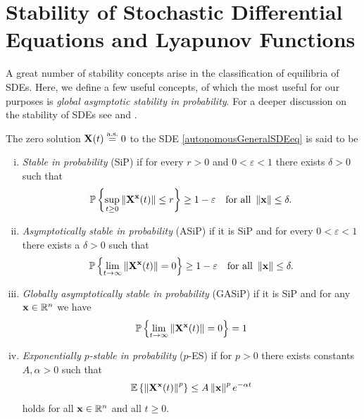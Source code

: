 \documentclass[a4paper,12pt,twoside,BCOR=10mm]{scrbook}
\begin{document}
\section{Stability of Stochastic Differential Equations and Lyapunov Functions}\label{SectionStabilitySDE}
A great number of stability concepts arise in the classification of equilibria of SDEs. Here, we define a few useful concepts, of which the most useful for our purposes is \textit{global asymptotic stability in probability}. For a deeper discussion on the stability of SDEs see \citep{mao2007stochastic} and \citep{sdestab2012khaminskii}.

\begin{definition}
The zero solution $\mathbf{X}(t) \stackrel{\text{a.s.}}{=} 0$ to the SDE \eqref{autonomousGeneralSDEeq} is said to be
\begin{enumerate}[i)]
    \item \textit{Stable in probability} (SiP) if for every $r > 0$ and $0 < \varepsilon < 1$ there exists $\delta > 0$ such that
    \begin{align*}
        \mathbb{P}\left\{\sup_{t\geq 0}\left\lVert\mathbf{X}^{\mathbf{x}}(t)\right\rVert\leq r\right\} \geq 1-\varepsilon \quad \text{for all } \left\lVert\mathbf{x}\right\rVert\leq \delta.
    \end{align*}
    \item \textit{Asymptotically stable in probability} (ASiP) if it is SiP and for every $0 < \varepsilon < 1$ there exists a $\delta > 0$ such that
    \begin{align*}
        \mathbb{P}\left\{\lim_{t\to \infty}\left\lVert\mathbf{X}^{\mathbf{x}}(t)\right\rVert = 0\right\} \geq 1 - \varepsilon \quad \text{for all } \left\lVert\mathbf{x}\right\rVert\leq \delta.
    \end{align*}
    \item \textit{Globally asymptotically stable in probability} (GASiP) if it is SiP and for any $\mathbf{x} \in \mathbb{R}^{n}$ we have
    \begin{align*}
        \mathbb{P}\left\{\lim_{t\to \infty} \left\lVert\mathbf{X}^{\mathbf{x}}(t)\right\rVert = 0\right\} = 1
    \end{align*}
    \item \textit{Exponentially $p$-stable in probability} ($p$-ES) if for $p > 0$ there exists constants $A, \alpha > 0$ such that
    \begin{align*}
        \mathbb{E}\left\{\left\lVert\mathbf{X}^{\mathbf{x}}(t)\right\rVert^p \right\} \leq A\left\lVert\mathbf{x}\right\rVert^p e^{-\alpha t}
    \end{align*}
    holds for all $\mathbf{x} \in \mathbb{R}^{n}$ and all $t \geq 0$.
\end{enumerate}
\end{definition}
\end{document}
